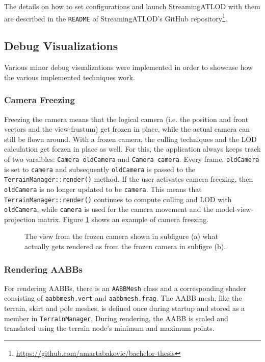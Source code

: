 The details on how to set configurations and launch StreamingATLOD with them 
are described in the \texttt{README} of StreamingATLOD's GitHub repository\footnote{\url{https://github.com/amartabakovic/bachelor-thesis}}.

\subsection{Debug Visualizations}
Various minor debug visualizations were implemented 
in order to showcase how the various implemented techniques work.

\subsubsection{Camera Freezing}
Freezing the camera means that the logical camera (i.e. the position and front vectors and the view-frustum) 
get frozen in place, while the actual camera can still be flown around. 
With a frozen camera, the culling techniques and the LOD calculation get forzen in place as well.
For this, the application always keeps track of two varaibles: \texttt{Camera oldCamera} and \texttt{Camera camera}.
Every frame, \texttt{oldCamera} is set to \texttt{camera} and subsequently
\texttt{oldCamera} is passed to the \texttt{TerrainManager::render()} method.
If the user activates camera freezing, then \texttt{oldCamera} is no longer updated to be \texttt{camera}.
This means that \texttt{TerrainManager::render()} continues to compute culling and LOD with \texttt{oldCamera},
while \texttt{camera} is used for the camera movement and the model-view-projection matrix.
Figure \ref{fig:freeze} shows an example of camera freezing.

\begin{figure}[H]
  \centering
  \qquad
  \caption{The view from the frozen camera shown in subfigure (a) what actually gets rendered as from the frozen camera in subfigre (b).}\label{fig:freeze}
\end{figure}

\subsubsection{Rendering AABBs}
For rendering AABBs, there is an \texttt{AABBMesh} class and a corresponding shader consisting of \texttt{aabbmesh.vert}
and \texttt{aabbmesh.frag}. The AABB mesh, like the terrain, skirt and pole meshes, is defined once 
during startup and stored as a member in \texttt{TerrainManager}.
During rendering, the AABB is scaled and translated using the terrain node's minimum and maximum points.

